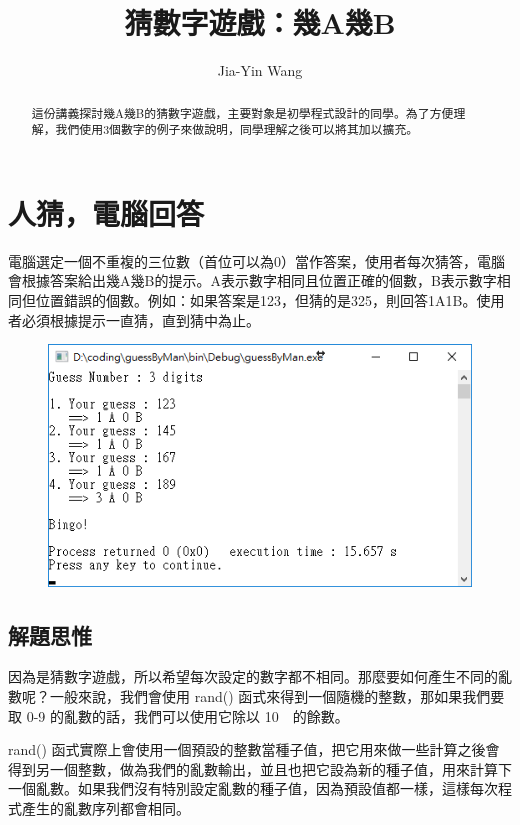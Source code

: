 \documentclass[12pt,a4paper]{article}
\begin{document}
\title{猜數字遊戲：幾A幾B}
\author{Jia-Yin Wang}
\maketitle

\begin{abstract}
這份講義探討幾A幾B的猜數字遊戲，主要對象是初學程式設計的同學。為了方便理解，我們使用3個數字的例子來做說明，同學理解之後可以將其加以擴充。
\end{abstract}

\section{人猜，電腦回答}

電腦選定一個不重複的三位數（首位可以為0）當作答案，使用者每次猜答，電腦會根據答案給出幾A幾B的提示。A表示數字相同且位置正確的個數，B表示數字相同但位置錯誤的個數。例如：如果答案是123，但猜的是325，則回答1A1B。使用者必須根據提示一直猜，直到猜中為止。
\begin{figure}[H]
	\centering
	\includegraphics{Fig/man}
\end{figure}

\subsection{解題思惟}
因為是猜數字遊戲，所以希望每次設定的數字都不相同。那麼要如何產生不同的亂數呢？一般來說，我們會使用 rand() 函式來得到一個隨機的整數，那如果我們要取 0-9 的亂數的話，我們可以使用它除以 10　的餘數。

rand() 函式實際上會使用一個預設的整數當種子值，把它用來做一些計算之後會得到另一個整數，做為我們的亂數輸出，並且也把它設為新的種子值，用來計算下一個亂數。如果我們沒有特別設定亂數的種子值，因為預設值都一樣，這樣每次程式產生的亂數序列都會相同。
\end{document}
